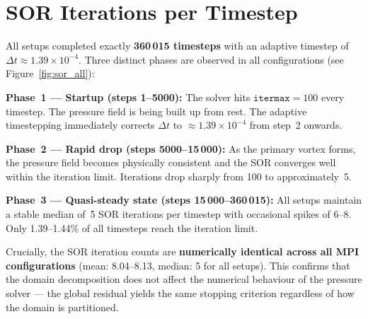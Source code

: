 \documentclass[11pt, a4paper]{article}
\begin{document}
\section{SOR Iterations per Timestep}

All setups completed exactly \textbf{360\,015 timesteps} with an adaptive
timestep of $\Delta t \approx 1.39\times10^{-4}$. Three distinct phases are
observed in all configurations (see Figure~\ref{fig:sor_all}):

\textbf{Phase~1 --- Startup (steps 1--5000):} The solver hits
$\mathtt{itermax} = 100$ every timestep. The pressure field is being built up
from rest. The adaptive timestepping immediately corrects $\Delta t$ to
$\approx1.39\times10^{-4}$ from step~2 onwards.

\textbf{Phase~2 --- Rapid drop (steps 5000--15\,000):} As the primary vortex
forms, the pressure field becomes physically consistent and the SOR converges
well within the iteration limit. Iterations drop sharply from 100 to
approximately~5.

\textbf{Phase~3 --- Quasi-steady state (steps 15\,000--360\,015):} All setups
maintain a stable median of~5 SOR iterations per timestep with occasional spikes
of 6--8. Only 1.39--1.44\% of all timesteps reach the iteration limit.

Crucially, the SOR iteration counts are \textbf{numerically identical across all
MPI configurations} (mean: 8.04--8.13, median: 5 for all setups). This confirms
that the domain decomposition does not affect the numerical behaviour of the
pressure solver --- the global residual yields the same stopping criterion
regardless of how the domain is partitioned.
\end{document}
